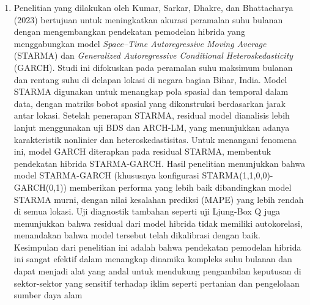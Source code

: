 \begin{enumerate}
    \item Penelitian yang dilakukan oleh Kumar, Sarkar, Dhakre, dan Bhattacharya (2023) bertujuan untuk meningkatkan akurasi peramalan suhu bulanan dengan mengembangkan pendekatan pemodelan hibrida yang menggabungkan model\textit{ Space–Time Autoregressive Moving Average } (STARMA) dan \textit{Generalized Autoregressive Conditional Heteroskedasticity } (GARCH). Studi ini difokuskan pada peramalan suhu maksimum bulanan dan rentang suhu di delapan lokasi di negara bagian Bihar, India. Model STARMA digunakan untuk menangkap pola spasial dan temporal dalam data, dengan matriks bobot spasial yang dikonstruksi berdasarkan jarak antar lokasi. Setelah penerapan STARMA, residual model dianalisis lebih lanjut menggunakan uji BDS dan ARCH-LM, yang menunjukkan adanya karakteristik nonlinier dan heteroskedastisitas. Untuk menangani fenomena ini, model GARCH diterapkan pada residual STARMA, membentuk pendekatan hibrida STARMA-GARCH. Hasil penelitian menunjukkan bahwa model STARMA-GARCH (khususnya konfigurasi STARMA(1,1,0,0)-GARCH(0,1)) memberikan performa yang lebih baik dibandingkan model STARMA murni, dengan nilai kesalahan prediksi (MAPE) yang lebih rendah di semua lokasi. Uji diagnostik tambahan seperti uji Ljung-Box Q juga menunjukkan bahwa residual dari model hibrida tidak memiliki autokorelasi, menandakan bahwa model tersebut telah dikalibrasi dengan baik. Kesimpulan dari penelitian ini adalah bahwa pendekatan pemodelan hibrida ini sangat efektif dalam menangkap dinamika kompleks suhu bulanan dan dapat menjadi alat yang andal untuk mendukung pengambilan keputusan di sektor-sektor yang sensitif terhadap iklim seperti pertanian dan pengelolaan sumber daya alam \citep{kumar_nodate}


\end{enumerate}

